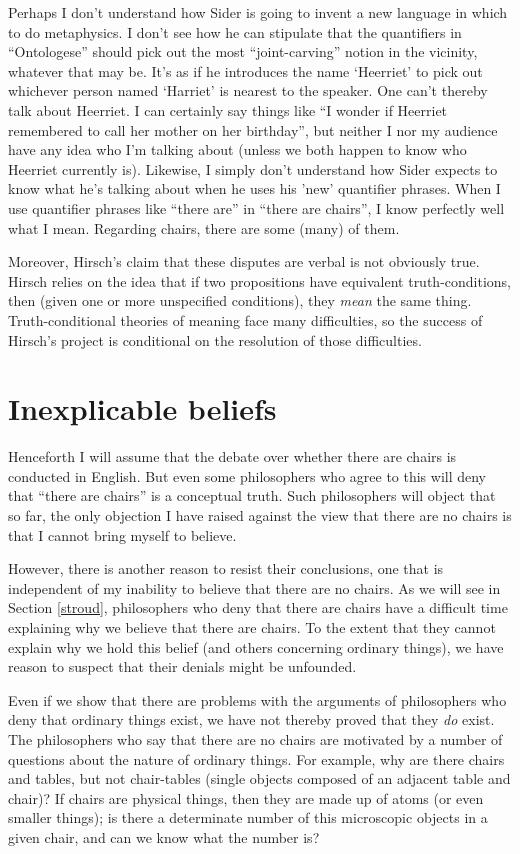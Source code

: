 \documentclass[11pt]{article}
\begin{document}
\begin{spacing}{1.25}
Perhaps I don't understand how Sider is going to invent a new language
in which to do metaphysics.  I don't see how he can stipulate that the
quantifiers in ``Ontologese'' should pick out the most
``joint-carving'' notion in the vicinity, whatever that may be.  It's
as if he introduces the name `Heerriet' to pick out whichever person
named `Harriet' is nearest to the speaker.  One can't thereby talk
about Heerriet.  I can certainly say things like ``I wonder if
Heerriet remembered to call her mother on her birthday'', but neither
I nor my audience have any idea who I'm talking about (unless we both
happen to know who Heerriet currently is).  Likewise, I simply don't
understand how Sider expects to know what he's talking about when he
uses his 'new' quantifier phrases.  When I use quantifier phrases like
``there are'' in ``there are chairs'', I know perfectly well what I
mean.  Regarding chairs, there are some (many) of them.

Moreover, Hirsch's claim that these disputes are verbal is not
obviously true.  Hirsch relies on the idea that if two propositions
have equivalent truth-conditions, then (given one or more unspecified
conditions), they {\em mean} the same thing.  Truth-conditional
theories of meaning face many difficulties, so the success of Hirsch's
project is conditional on the resolution of those difficulties.

\section{Inexplicable beliefs}
Henceforth I will assume that the debate over whether there are chairs
is conducted in English.  But even some philosophers who agree to this
will deny that ``there are chairs'' is a conceptual truth.  Such
philosophers will object that so far, the only objection I have raised
against the view that there are no chairs is that I cannot bring
myself to believe.

However, there is another reason to resist their conclusions, one that
is independent of my inability to believe that there are no chairs.
As we will see in Section \ref{stroud}, philosophers who deny that
there are chairs have a difficult time explaining why we believe that
there are chairs.  To the extent that they cannot explain why we hold
this belief (and others concerning ordinary things), we have reason to
suspect that their denials might be unfounded.

Even if we show that there are problems with the arguments of
philosophers who deny that ordinary things exist, we have not thereby
proved that they {\em do} exist.  The philosophers who say that there
are no chairs are motivated by a number of questions about the nature
of ordinary things.  For example, why are there chairs and tables, but
not chair-tables (single objects composed of an adjacent table and
chair)?  If chairs are physical things, then they are made up of atoms
(or even smaller things); is there a determinate number of this
microscopic objects in a given chair, and can we know what the number
is?


\end{spacing}
\end{document}
